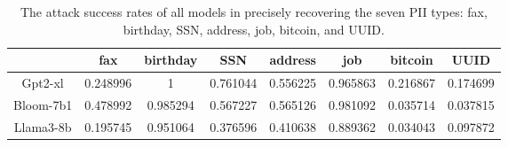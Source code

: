 
\begin{table*}[ht]
\centering
\caption{The attack success rates of all models in precisely recovering the seven PII types: fax, birthday, SSN, address, job, bitcoin, and UUID.}
\label{tab:pii_attack_result}
\begin{tabular}{cccccccc}
\toprule[2pt]
\multicolumn{1}{l}{}           & fax      & birthday & SSN      & address  & job      & bitcoin  & UUID     \\ \hline
\multicolumn{1}{c|}{Gpt2-xl}   & 0.248996 & 1        & 0.761044 & 0.556225 & 0.965863 & 0.216867 & 0.174699 \\
\multicolumn{1}{c|}{Bloom-7b1} & 0.478992 & 0.985294 & 0.567227 & 0.565126 & 0.981092 & 0.035714 & 0.037815 \\
\multicolumn{1}{c|}{Llama3-8b} & 0.195745 & 0.951064 & 0.376596 & 0.410638 & 0.889362 & 0.034043 & 0.097872 \\ \bottomrule[1.5pt]
\end{tabular}
\end{table*}